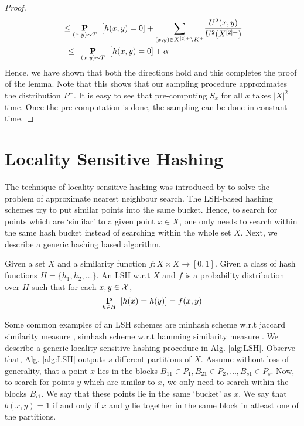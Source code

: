 \begin{proof}
\begin{align*}
  & \le \underset{(x, y) \sim T}{\mathbf P}\enspace \big[ h(x, y) = 0 ] + \underset{(x, y)\in X^{[2]+} \setminus K^+}{\sum} \frac{U^2(x, y)}{U^2(X^{[2]+})}\\
  &  \enspace\le\enspace  \underset{(x, y) \sim T}{\mathbf P}\enspace \big[ h(x, y) = 0 ] + \alpha
\end{align*}
Hence, we have shown that both the directions hold and this completes the proof of the lemma. Note that this shows that our sampling procedure approximates the distribution $P^+$. It is easy to see that pre-computing $S_x$ for all $x$ takes $|X|^2$ time. Once the pre-computation is done, the sampling can be done in constant time.
\end{proof}

\section{Locality Sensitive Hashing}
\label{section:A-LSH}
The technique of locality sensitive hashing was introduced by \cite{gionis1999similarity} to solve the problem of approximate nearest neighbour search. The LSH-based hashing schemes try to put similar points into the same bucket. Hence, to search for points which are `similar' to a given point $x \in X$, one only needs to search within the same hash bucket instead of searching within the whole set $X$. Next, we describe a generic hashing based algorithm. 

\begin{definition}
\label{defn:LSH}
Given a set $X$ and a similarity function $f:X \times X \rightarrow [0, 1]$. Given a class of hash functions $H = \{h_1, h_2, \ldots \}$. An LSH w.r.t $X$ and $f$ is a probability distribution over $H$ such that for each $x, y \in \mathcal X$, $$\underset{h \in H}{\mathbf P}\enspace [h(x) = h(y)] = f(x, y)$$
\end{definition}
\noindent Some common examples of an LSH schemes are minhash scheme w.r.t jaccard similarity measure \cite{broder2000min, broder1997resemblance}, simhash scheme w.r.t hamming similarity measure \cite{charikar2002similarity}. We describe a generic locality sensitive hashing procedure in Alg. \ref{alg:LSH}. Observe that, Alg. \ref{alg:LSH} outputs $s$ different partitions of $X$. Assume without loss of generality, that a point $x$ lies in the blocks $B_{11} \in P_1, B_{21} \in P_2, \ldots, B_{s1} \in P_s$. Now, to search for points $y$ which are similar to $x$, we only need to search within the blocks $B_{i1}$. We say that these points lie in the same `bucket' as $x$. We say that $b(x, y) = 1$ if and only if $x$ and $y$ lie together in the same block in atleast one of the partitions.

